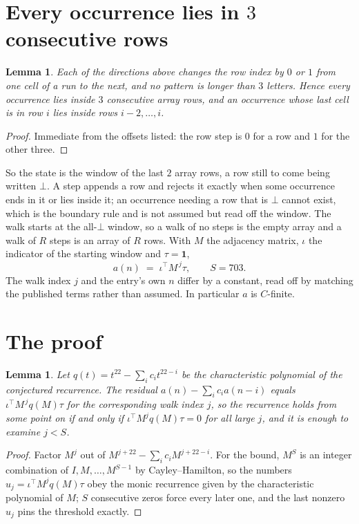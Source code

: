 \documentclass[11pt,a4paper]{article}
\theoremstyle{plain}
\newtheorem{lemma}[theorem]{Lemma}
\theoremstyle{definition}
\begin{document}
\section{Every occurrence lies in $3$ consecutive rows}

\begin{lemma}\label{lem:win}
Each of the directions above changes the row index by $0$ or $1$ from one cell of a run to the
next, and no pattern is longer than $3$ letters. Hence every occurrence lies inside $3$
consecutive array rows, and an occurrence whose last cell is in row $i$ lies inside rows
$i-2,\dots,i$.
\end{lemma}

\begin{proof}
Immediate from the offsets listed: the row step is $0$ for a row and $1$ for the other three.
\end{proof}

So the state is the window of the last $2$ array rows, a row still to come being written
$\bot$. A step appends a row and rejects it exactly when some occurrence ends in it or lies
inside it; an occurrence needing a row that is $\bot$ cannot exist, which is the boundary rule
and is not assumed but read off the window. The walk starts at the all-$\bot$ window, so a walk
of no steps is the empty array and a walk of $R$ steps is an array of $R$ rows. With $M$ the
adjacency matrix, $\iota$ the indicator of the starting window and $\tau=\mathbf{1}$,
\[
a(n)\;=\;\iota^{\!\top}M^{\,j}\tau ,\qquad S=703.
\]
The walk index $j$ and the entry's own $n$ differ by a constant, read off by matching the
published terms rather than assumed. In particular $a$ is $C$-finite.

\section{The proof}

\begin{lemma}\label{lem:crit}
Let $q(t)=t^{22}-\sum_i c_it^{22-i}$ be the characteristic polynomial of the
conjectured recurrence. The residual $a(n)-\sum_ic_ia(n-i)$ equals
$\iota^{\!\top}M^{\,j}q(M)\tau$ for the corresponding walk index $j$, so the recurrence
holds from some point on if and only if $\iota^{\!\top}M^{j}q(M)\tau=0$ for all large $j$,
and it is enough to examine $j<S$.
\end{lemma}

\begin{proof}
Factor $M^{j}$ out of $M^{j+22}-\sum_ic_iM^{j+22-i}$. For the bound, $M^{S}$
is an integer combination of $I,M,\dots,M^{S-1}$ by Cayley--Hamilton, so the numbers
$u_j=\iota^{\!\top}M^{j}q(M)\tau$ obey the monic recurrence given by the characteristic
polynomial of $M$; $S$ consecutive zeros force every later one, and the last nonzero $u_j$
pins the threshold exactly.
\end{proof}
\end{document}
